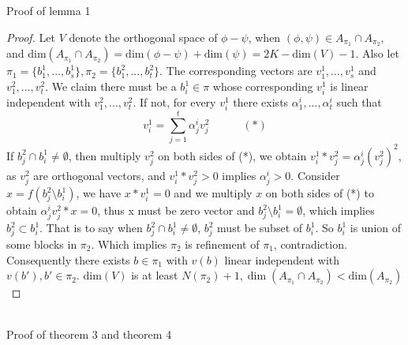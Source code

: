 \documentclass[11pt]{amsart}
\begin{document}
Proof of lemma 1
\begin{proof}
Let $V$ denote the orthogonal space of $\phi - \psi$, when $(\phi,\psi)\in A_{\pi_1} \cap A_{\pi_2}$, and $\text{dim}(A_{\pi_1} \cap A_{\pi_2}) = \text{dim}(\phi - \psi) + \text{dim}(\psi) = 2K - \text{dim}(V) - 1$. Also let $\pi_1 = \{b_1^1,...,b_s^1\}, \pi_2 = \{b_1^2,...,b_t^2\}$. The corresponding vectors are $v_1^1,...,v_s^1$ and $v_1^2,...,v_t^2$. We claim there must be a $b_i^1\in \pi$ whose corresponding $v_i^1$ is linear independent with $v_1^2,...,v_t^2$. If not, for every $v_i^1$ there exists $\alpha_1^i,...,\alpha_t^i$ such that 
\[
v_i^1 = \sum_{j = 1}^t \alpha_j^i v_j^2 \quad\quad\quad(*)
\]
If $b_j^2 \cap b_i^1 \neq \emptyset$, then multiply $v_j^2$ on both sides of (*), we obtain $v_i^1 * v_j^2 = \alpha_j^i (v_j^2)^2$, as $v_j^2$ are orthogonal vectors, and $v_i^1 * v_j^2 > 0$ implies $\alpha_j^i > 0$. Consider $x = f(b_j^2\setminus b_i^1)$, we have $x*v_i^1 = 0$ and we multiply $x$ on both sides of (*) to obtain $\alpha_j^i v_j^2*x = 0$, thus x must be zero vector and $b_j^2\setminus b_i^1= \emptyset$, which implies $b_j^2 \subset b_i^1$. That is to say when $b_j^2 \cap b_i^1 \neq \emptyset$, $b_j^2$ must be subset of $b_i^1$. So $b_i^1$ is union of some blocks in $\pi_2$. Which implies $\pi_2$ is refinement of $\pi_1$, contradiction.\\
Consequently there exists $b\in\pi_1$ with $v(b)$ linear independent with $v(b'), b'\in\pi_2$. $\text{dim}(V)$ is at least $N(\pi_2) + 1, \dim(A_{\pi_1} \cap A_{\pi_2}) < \text{dim}(A_{\pi_2})$
\end{proof}
\hfill\\
Proof of theorem 3 and theorem 4
\end{document}
